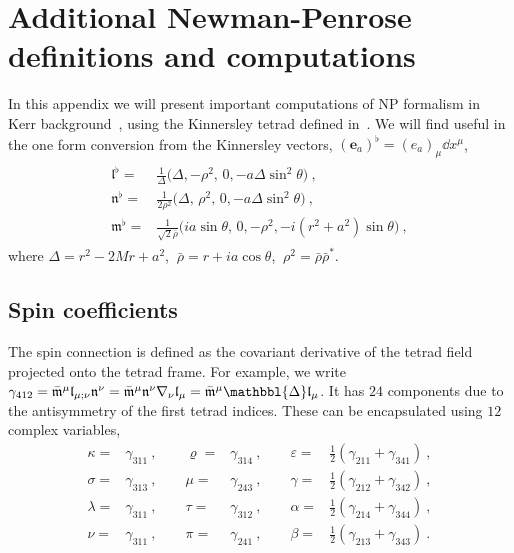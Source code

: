 
\chapter{Additional Newman-Penrose definitions and computations} %
\label{AppendixNPFormalism}

In this appendix we will present important computations of NP formalism in Kerr background~, using the Kinnersley tetrad defined in~.
We will find useful in the one form conversion from the Kinnersley vectors, $(\bm{e}_a)^\flat = (e_a)_\mu \dd x^\mu$,
\begin{align}
    \begin{split}
        \bm{\mathfrak{l}}^\flat =& \frac{1}{\Delta} \Bigr(\Delta, -\rho^2, \,0, -a \Delta \sin^2\theta \Bigr) ~, \\
        \bm{\mathfrak{n}}^\flat =& \frac{1}{2 \rho^2} \Bigr(\Delta, \,\rho^2, \,0, -a \Delta \sin^2\theta \Bigr) ~, \\
        \bm{\mathfrak{m}}^\flat =& \frac{1}{ \sqrt{2} \bar{\rho} } \Bigr( i a \sin\theta, \,0, -\rho^2, - i (r^2+a^2) \sin\theta \Bigr) ~,
    \end{split}
\end{align}
where $\Delta=r^2-2 M r + a^2$, $~\bar{\rho} = r + i a \cos\theta$, $~\rho^2 = \bar{\rho} \bar{\rho}^*$.

\section{Spin coefficients}
\label{AppendixNPSpinCoef}

The spin connection is defined as the covariant derivative of the tetrad field projected onto the tetrad frame. 
For example, we write $\gamma_{412} = \bar{\mathfrak{m}}^\mu \mathfrak{l}_{\mu;\nu} \mathfrak{n}^\nu =  \bar{\mathfrak{m}}^\mu \mathfrak{n}^\nu \nabla_\nu \mathfrak{l}_{\mu} = \bar{\mathfrak{m}}^\mu \mathbbl{\Delta} \mathfrak{l}_\mu$.
It has $24$ components due to the antisymmetry of the first tetrad indices. These can be encapsulated using $12$ complex variables,
\begin{equation}
    \begin{alignedat}{4}
        \kappa  =& \gamma_{311} ~,\qquad \varrho =& \gamma_{314} ~,\qquad \varepsilon =& \tfrac{1}{2} (\gamma_{211} + \gamma_{341}) ~, \\
        \sigma  =& \gamma_{313} ~,\qquad \mu     =& \gamma_{243} ~,\qquad \gamma      =& \tfrac{1}{2} (\gamma_{212} + \gamma_{342}) ~, \\
        \lambda =& \gamma_{311} ~,\qquad \tau    =& \gamma_{312} ~,\qquad \alpha      =& \tfrac{1}{2} (\gamma_{214} + \gamma_{344}) ~, \\
        \nu     =& \gamma_{311} ~,\qquad \pi     =& \gamma_{241} ~,\qquad \beta       =& \tfrac{1}{2} (\gamma_{213} + \gamma_{343}) ~.
    \end{alignedat}
\end{equation}

